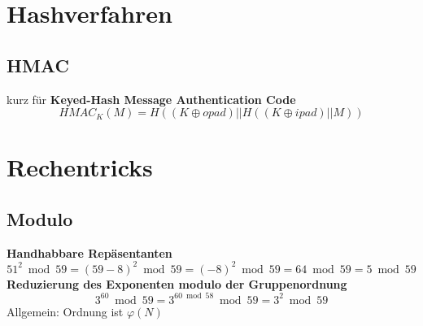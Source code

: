 \documentclass[10pt,a4paper]{article}
\begin{document}
        \section{Hashverfahren}
        \subsection{HMAC}
        kurz für \textbf{Keyed-Hash Message Authentication Code} \\
        \[\mathit{HMAC}_{K}(M) = H((K \oplus \mathit{opad}) || H((K \oplus \mathit{ipad}) || M))\]

        \section{Rechentricks}
        \subsection{Modulo}
        \textbf{Handhabbare Repäsentanten}
        \[51^2 \bmod 59 = (59-8)^2 \bmod 59 = (-8)^2 \bmod 59 = 64 \bmod 59 = 5 \bmod 59\]
        \textbf{Reduzierung des Exponenten modulo der Gruppenordnung}
        \[3^{60} \bmod 59 = 3^{60 \bmod 58} \bmod 59 = 3^2 \bmod 59\]
        Allgemein: Ordnung ist \(\varphi(N)\)
\end{document}
